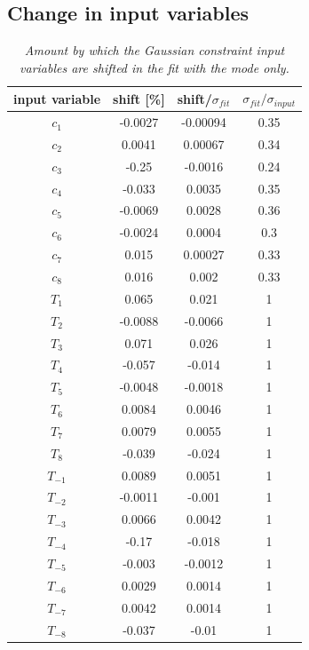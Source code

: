 \subsection{Change in input variables}
\begin{table}[!h]
	\begin{center}
		\begin{tabular}{c| c| c|c}
			input variable & \quad shift [\%] \quad & shift/$\sigma_{fit}$ & \quad $\sigma_{fit}/ \sigma_{input}$\\
			\hline
			\hline
$c_1$ & -0.0027 & -0.00094 & 0.35\\ 
$c_2$ & 0.0041 & 0.00067 & 0.34\\ 
$c_3$ & -0.25 & -0.0016 & 0.24\\ 
$c_4$ & -0.033 & 0.0035 & 0.35\\ 
$c_5$ & -0.0069 & 0.0028 & 0.36\\ 
$c_6$ & -0.0024 & 0.0004 & 0.3\\ 
$c_7$ & 0.015 & 0.00027 & 0.33\\ 
$c_8$ & 0.016 & 0.002 & 0.33\\ 
$T_1$ & 0.065 & 0.021 & 1\\ 
$T_2$ & -0.0088 & -0.0066 & 1\\ 
$T_3$ & 0.071 & 0.026 & 1\\ 
$T_4$ & -0.057 & -0.014 & 1\\ 
$T_5$ & -0.0048 & -0.0018 & 1\\ 
$T_6$ & 0.0084 & 0.0046 & 1\\ 
$T_7$ & 0.0079 & 0.0055 & 1\\ 
$T_8$ & -0.039 & -0.024 & 1\\ 
$T_{-1}$ & 0.0089 & 0.0051 & 1\\ 
$T_{-2}$ & -0.0011 & -0.001 & 1\\ 
$T_{-3}$ & 0.0066 & 0.0042 & 1\\ 
$T_{-4}$ & -0.17 & -0.018 & 1\\ 
$T_{-5}$ & -0.003 & -0.0012 & 1\\ 
$T_{-6}$ & 0.0029 & 0.0014 & 1\\ 
$T_{-7}$ & 0.0042 & 0.0014 & 1\\ 
$T_{-8}$ & -0.037 & -0.01 & 1\\ 
\end{tabular}
\end{center}
\caption{\textit{Amount by which the Gaussian constraint input variables are shifted in the fit with the \KsPiPi mode only.}}
\end{table} 
\clearpage
